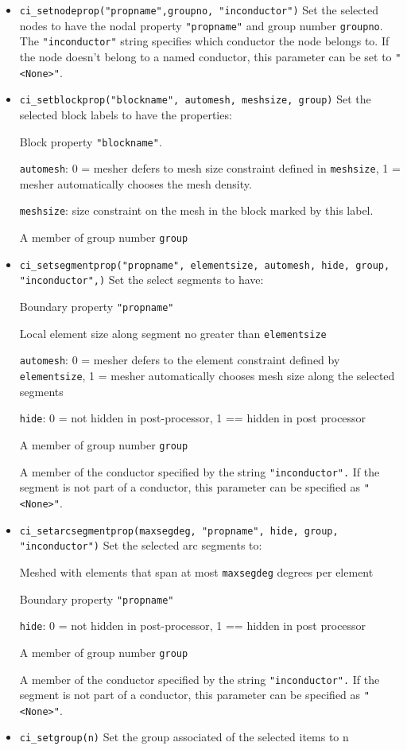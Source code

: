 \begin{itemize}
\item {\tt ci\_setnodeprop("propname",groupno, "inconductor")} Set the selected
nodes to have the nodal property \texttt{"propname"} and group
number \texttt{groupno}. The \texttt{"inconductor"} string
specifies which conductor the node belongs to. If the node doesn't
belong to a named conductor, this parameter can be set to
\texttt{"<None>"}.

\item {\tt ci\_setblockprop("blockname", automesh, meshsize, group)} Set the
selected block labels to have the properties:

Block property \texttt{"blockname"}.

\texttt{automesh}: 0 = mesher defers to mesh size constraint defined in
\texttt{meshsize}, 1 = mesher automatically chooses the mesh density.

\texttt{meshsize}: size constraint on the mesh in the block marked by this
label.

A member of group number \texttt{group}

\item {\tt ci\_setsegmentprop("propname", elementsize, automesh, hide, group,
"inconductor",)} Set the select segments to have:

Boundary property \texttt{"propname"}

Local element size along segment no greater than
\texttt{elementsize}

\texttt{automesh}: 0 = mesher defers to the element constraint defined by
\texttt{elementsize}, 1 = mesher automatically chooses mesh size along the
selected segments

\texttt{hide}: 0 = not hidden in post-processor, 1 == hidden in post
processor

A member of group number \texttt{group}

A member of the conductor specified by the string
\texttt{"inconductor".} If the segment is not part of a conductor,
this parameter can be specified as
\texttt{"<None>"}.

\item {\tt ci\_setarcsegmentprop(maxsegdeg, "propname", hide, group,
"inconductor")} Set the selected arc segments to:

Meshed with elements that span at most \texttt{maxsegdeg} degrees
per element

Boundary property \texttt{"propname"}

\texttt{hide}: 0 = not hidden in post-processor, 1 == hidden in post
processor

A member of group number \texttt{group}

A member of the conductor specified by the string
\texttt{"inconductor".} If the segment is not part of a conductor,
this parameter can be specified as
\texttt{"<None>"}.

\item{\tt ci\_setgroup(n)} Set the group associated of the selected items to n
\end{itemize}

